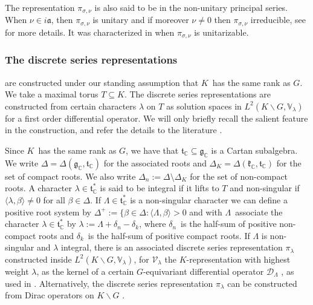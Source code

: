 \documentclass[a4paper,reqno]{amsart}
\numberwithin{equation}{section}
\def\C{\mathbb{C}}
\theoremstyle{definition}
\theoremstyle{remark}
\begin{document}
The representation $\pi_{\sigma,\nu}$ is also said to be in the non-unitary principal series. When $\nu\in i\mathfrak{a}$, then $\pi_{\sigma,\nu}$ is unitary and if moreover $\nu\neq 0$ then $\pi_{\sigma,\nu}$ irreducible, see \cite[Theorem 5]{knappstein} for more details. It was characterized in \cite[Section 14]{knappstein} when $\pi_{\sigma,\nu}$ is unitarizable. 

\subsubsection{The discrete series representations} 
\label{subsubecdisc} 
are constructed under our standing assumption that $K$ has the same rank as $G$. We take a maximal torus $T\subseteq K$. The discrete series representations are constructed from certain characters $\lambda$ on $T$ as solution spaces in $L^2(K\backslash G,\mathbb{V}_\lambda)$ for a first order differential operator. We will only briefly recall the salient feature in the construction, and refer the details to the literature \cite{atiischmid,knappbook,laffaicm,partha,schmiddie}.


Since $K$ has the same rank as $G$, we have that $\mathfrak{t}_\C\subseteq \mathfrak{g}_\C$ is a Cartan subalgebra. We write $\Delta=\Delta(\mathfrak{g}_\C,\mathfrak{t}_\C)$ for the associated roots and $\Delta_K=\Delta(\mathfrak{k}_\C,\mathfrak{t}_\C)$ for the set of compact roots. We also write $\Delta_n:=\Delta\setminus \Delta_K$ for the set of non-compact roots. A character $\lambda \in \mathfrak{t}_\C^*$ is said to be integral if it lifts to $T$ and non-singular if $\langle \lambda,\beta\rangle\neq 0$ for all $\beta\in \Delta$. If $\Lambda\in \mathfrak{t}_\C^*$ is a non-singular character we can define a positive root system by $\Delta^+:=\{\beta\in \Delta: \langle \Lambda,\beta\rangle> 0$ and with $\Lambda$ associate the character $\lambda\in \mathfrak{t}_\C^*$ by $\lambda:=\Lambda+\delta_n-\delta_k$, where $\delta_n$ is the half-sum of positive non-compact roots and $\delta_k$ is the half-sum of positive compact roots. If $\Lambda$ is non-singular and $\lambda$ integral, there is an associated discrete series representation $\pi_\lambda$ constructed inside $L^2(K\backslash G,\mathbb{V}_\lambda)$, for $\mathcal{V}_\lambda$ the $K$-representation with highest weight $\lambda$, as the kernel of a certain $G$-equivariant differential operator $\mathcal{D}_\Lambda$ \cite{schmiddie}, as used in \cite[Section 2]{knappwallach}. Alternatively, the discrete series representation $\pi_\lambda$ can be constructed from Dirac operators on $K\backslash G$ \cite{atiischmid,laffaicm,partha}. 
\end{document}

